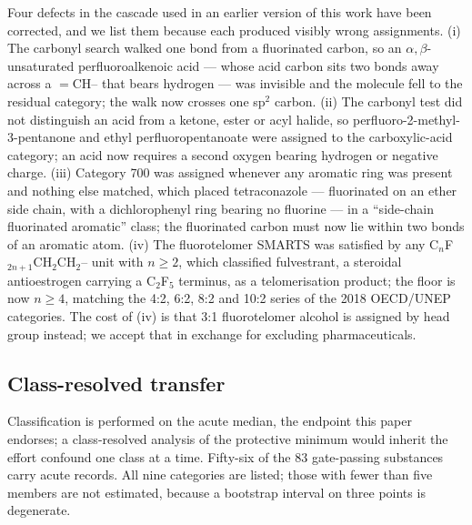 \documentclass[11pt]{article}
\begin{document}
Four defects in the cascade used in an earlier version of this work have been
corrected, and we list them because each produced visibly wrong assignments.
(i) The carbonyl search walked one bond from a fluorinated carbon, so an
$\alpha,\beta$-unsaturated perfluoroalkenoic acid --- whose acid carbon sits two
bonds away across a $=$CH-- that bears hydrogen --- was invisible and the
molecule fell to the residual category; the walk now crosses one sp$^2$ carbon.
(ii) The carbonyl test did not distinguish an acid from a ketone, ester or acyl
halide, so perfluoro-2-methyl-3-pentanone and ethyl perfluoropentanoate were
assigned to the carboxylic-acid category; an acid now requires a second oxygen
bearing hydrogen or negative charge. (iii) Category 700 was assigned whenever
any aromatic ring was present and nothing else matched, which placed
tetraconazole --- fluorinated on an ether side chain, with a dichlorophenyl ring
bearing no fluorine --- in a ``side-chain fluorinated aromatic'' class; the
fluorinated carbon must now lie within two bonds of an aromatic atom. (iv) The
fluorotelomer SMARTS was satisfied by any C$_n$F$_{2n+1}$CH$_2$CH$_2$-- unit
with $n\ge2$, which classified fulvestrant, a steroidal antioestrogen carrying a
C$_2$F$_5$ terminus, as a telomerisation product; the floor is now $n\ge4$,
matching the 4:2, 6:2, 8:2 and 10:2 series of the 2018 OECD/UNEP categories. The
cost of (iv) is that 3:1 fluorotelomer alcohol is assigned by head group
instead; we accept that in exchange for excluding pharmaceuticals.

\subsection*{Class-resolved transfer}

Classification is performed on the acute median, the endpoint this paper
endorses; a class-resolved analysis of the protective minimum would inherit the
effort confound one class at a time. Fifty-six of the 83 gate-passing substances
carry acute records. All nine categories are listed; those with fewer than five
members are not estimated, because a bootstrap interval on three points is
degenerate.
\end{document}
